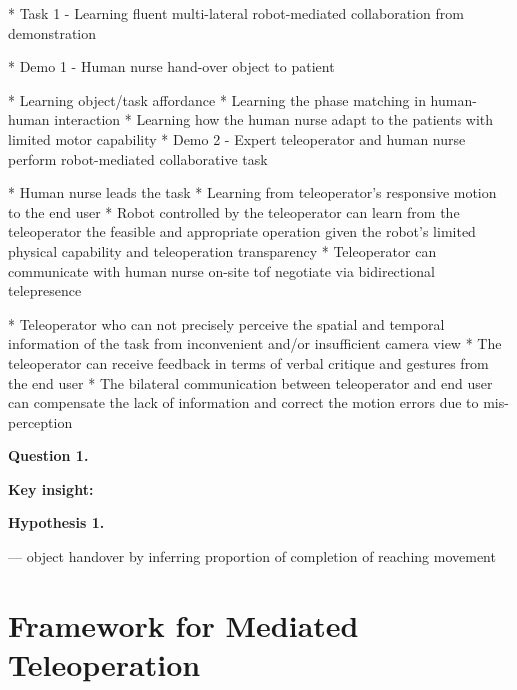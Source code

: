 \documentclass[11pt,letterpaper]{article}
\begin{document}
* Task 1 - Learning fluent multi-lateral robot-mediated collaboration from demonstration

* Demo 1 - Human nurse hand-over object to patient

	* Learning object/task affordance
	* Learning the phase matching in human-human interaction
	* Learning how the human nurse adapt to the patients with limited motor capability 
* Demo 2 - Expert teleoperator and human nurse perform robot-mediated collaborative task

	* Human nurse leads the task
	* Learning from teleoperator's responsive motion to the end user 
	* Robot controlled by the teleoperator can learn from the teleoperator the feasible and appropriate operation given the robot's limited physical capability and teleoperation transparency
	* Teleoperator can communicate with human nurse on-site tof negotiate via bidirectional telepresence

		* Teleoperator who can not precisely perceive the spatial and temporal information of the task from inconvenient and/or insufficient camera view
		* The teleoperator can receive feedback in terms of verbal critique and gestures from the end user
		* The bilateral communication between teleoperator and end user can compensate the lack of information and correct the motion errors due to mis-perception








{\bf Question 1. }

\noindent
{\bf Key insight:}

\noindent
{\bf Hypothesis 1.}

--- object handover by inferring proportion of completion of reaching movement

\section{Framework for Mediated Teleoperation}
\end{document}
